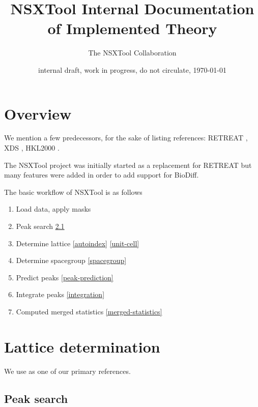 \documentclass[11pt,a4paper]{article}
\begin{document}
\title{NSXTool Internal Documentation of Implemented Theory}
\author{The NSXTool Collaboration}

\date{internal draft, work in progress, do not circulate, \today}


\maketitle

\section{Overview}

We mention a few predecessors, for the sake of listing references: RETREAT \cite{StMc13},
XDS \cite{Kab10a}, HKL2000 \cite{OtMi97,OtMi06,GewOJ}.

The NSXTool project was initially started as a replacement for RETREAT but many features were added
in order to add support for BioDiff.

The basic workflow of NSXTool is as follows
\begin{enumerate}
  \item Load data, apply masks
  \item Peak search \ref{peak-search}
  \item Determine lattice \ref{autoindex} \ref{unit-cell}
  \item Determine spacegroup \ref{spacegroup}
  \item Predict peaks \ref{peak-prediction}
  \item Integrate peaks \ref{integration}
  \item Computed merged statistics \ref{merged-statistics}
\end{enumerate}

\section{Lattice determination}

We use \cite{BuGG16} as one of our primary references.


\subsection{Peak search} \label{peak-search}
\end{document}
